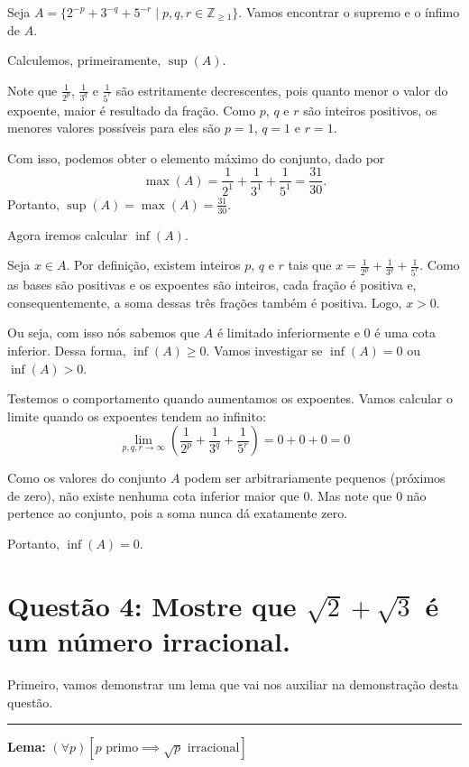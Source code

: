 \documentclass[12pt]{article}
\newcommand{\customline}{\noindent\rule{\linewidth}{0.4pt}\par\vspace{1em}}
\begin{document}
	Seja $A = \{2^{-p} + 3^{-q} + 5^{-r} \mid p, q, r \in \mathbb{Z}_{\geq 1}\}$. Vamos encontrar o supremo e o ínfimo de $A$.
	
	Calculemos, primeiramente, $\sup(A)$.
	
	Note que $\frac{1}{2^p}$, $\frac{1}{3^q}$ e $\frac{1}{5^r}$ são estritamente decrescentes, pois quanto menor o valor do expoente, maior é resultado da fração. Como $p$, $q$ e $r$ são inteiros positivos, os menores valores possíveis para eles são $p = 1$, $q = 1$ e $r = 1$.
	
	Com isso, podemos obter o elemento máximo do conjunto, dado por
	\[
	\max(A) = \frac{1}{2^1} + \frac{1}{3^1} + \frac{1}{5^1} = \frac{31}{30}.
	\]
	Portanto, $\sup(A) = \max(A) = \frac{31}{30}$.
	
	Agora iremos calcular $\inf(A)$.
	
	Seja $x \in A$. Por definição, existem inteiros $p$, $q$ e $r$ tais que $x = \frac{1}{2^p} + \frac{1}{3^q} + \frac{1}{5^r}$. Como as bases são positivas e os expoentes são inteiros, cada fração é positiva e, consequentemente, a soma dessas três frações também é positiva. Logo, $x > 0$.
	
	Ou seja, com isso nós sabemos que $A$ é limitado inferiormente e 0 é uma cota inferior. Dessa forma, $\inf(A) \geq 0$. Vamos investigar se $\inf(A) = 0$ ou $\inf(A) > 0$.
	
	Testemos o comportamento quando aumentamos os expoentes. Vamos calcular o limite quando os expoentes tendem ao infinito:
	\[
	\lim_{p,q,r \to \infty}{\left( \frac{1}{2^p} + \frac{1}{3^q} + \frac{1}{5^r} \right)} = 0 + 0 + 0 = 0
	\]
	
	Como os valores do conjunto $A$ podem ser arbitrariamente pequenos (próximos de zero), não existe nenhuma cota inferior maior que 0. Mas note que 0 não pertence ao conjunto, pois a soma nunca dá exatamente zero.
	
	Portanto, $\inf(A) = 0$. \blacksquare
	
	\section*{Questão 4: Mostre que $\sqrt{2} + \sqrt{3}$ é um número irracional.}
	
	Primeiro, vamos demonstrar um lema que vai nos auxiliar na demonstração desta questão.
	
	\customline
	
	\textbf{Lema:} $(\forall p)[p \text{ primo} \implies \sqrt{p} \text{ irracional}]$
	
\end{document}
